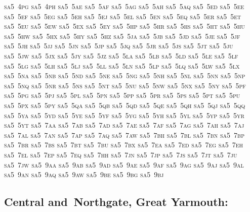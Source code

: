 \documentclass[12pt,a4paper]{article}
\begin{document}
\textsc{\lowercase{%
SA5~4PG	SA5~4PH	SA5~5AE	SA5~5AF	SA5~5AG	SA5~5AH
SA5~5AQ	SA5~5ED	SA5~5EE	SA5~5EF	SA5~5EG	SA5~5EH
SA5~5EJ	SA5~5EL	SA5~5EN	SA5~5EQ	SA5~5ER	SA5~5ET
SA5~5EU	SA5~5EW	SA5~5EX	SA5~5EY	SA5~5HP	SA5~5HR
SA5~5HS	SA5~5HT	SA5~5HU	SA5~5HW	SA5~5HX	SA5~5HY
SA5~5HZ	SA5~5JA	SA5~5JB	SA5~5JD	SA5~5JE	SA5~5JF
SA5~5JH	SA5~5JJ	SA5~5JN	SA5~5JP	SA5~5JQ	SA5~5JR
SA5~5JS	SA5~5JT	SA5~5JU	SA5~5JW	SA5~5JX	SA5~5JY
SA5~5JZ	SA5~5LA	SA5~5LB	SA5~5LD	SA5~5LE	SA5~5LF
SA5~5LG	SA5~5LH	SA5~5LJ	SA5~5LL	SA5~5LN	SA5~5LP
SA5~5LQ	SA5~5LW	SA5~5LX	SA5~5NA	SA5~5NB	SA5~5ND
SA5~5NE	SA5~5NG	SA5~5NH	SA5~5NL	SA5~5NN	SA5~5NP
SA5~5NQ	SA5~5NR	SA5~5NS	SA5~5NT	SA5~5NU	SA5~5NW
SA5~5NX	SA5~5NY	SA5~5PF	SA5~5PG	SA5~5PJ	SA5~5PL
SA5~5PN	SA5~5PP	SA5~5PR	SA5~5PS	SA5~5PT	SA5~5PU
SA5~5PX	SA5~5PY	SA5~5QA	SA5~5QB	SA5~5QD	SA5~5QE
SA5~5QH	SA5~5QJ	SA5~5QQ	SA5~5YA	SA5~5YD	SA5~5YE
SA5~5YF	SA5~5YG	SA5~5YH	SA5~5YL	SA5~5YP	SA5~5YR
SA5~5YT	SA5~7AA	SA5~7AB	SA5~7AD	SA5~7AE	SA5~7AF
SA5~7AG	SA5~7AH	SA5~7AJ	SA5~7AL	SA5~7AN	SA5~7AP
SA5~7AQ	SA5~7AW	SA5~7BH	SA5~7BL	SA5~7BN	SA5~7BP
SA5~7BR	SA5~7BS	SA5~7BT	SA5~7BU	SA5~7BX	SA5~7EA
SA5~7ED	SA5~7EG	SA5~7EH	SA5~7EL	SA5~7EP	SA5~7EQ
SA5~7HH	SA5~7JN	SA5~7JP	SA5~7JS	SA5~7JT	SA5~7JU
SA5~7JW	SA5~9AA	SA5~9AB	SA5~9AD	SA5~9AE	SA5~9AF
SA5~9AG	SA5~9AJ	SA5~9AL	SA5~9AN	SA5~9AQ	SA5~9AW
SA5~9BE	SA5~9BG	SA5~9BJ	
}}
		
\subsection*{Central and~Northgate, Great Yarmouth:}
\end{document}
